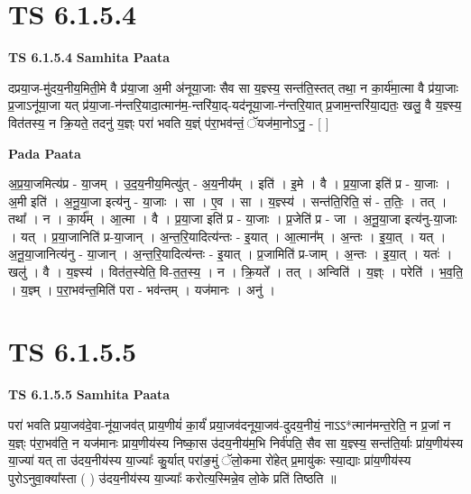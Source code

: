 \documentclass[17pt]{extarticle}
\begin{document}

\section{ TS 6.1.5.4 }

\textbf{TS 6.1.5.4 } \newline
\textbf{Samhita Paata} \newline

दप्रया॒ज-मु॑दय॒नीय॒मिती॒मे वै प्र॑या॒जा अ॒मी अ॑नूया॒जाः सैव सा य॒ज्ञ्स्य॒ सन्त॑ति॒स्तत् तथा॒ न का॒र्य॑मा॒त्मा वै प्र॑या॒जाः प्र॒जाऽनू॑या॒जा यत् प्र॑या॒जा-न॑न्तरि॒यादा॒त्मान॑म॒-न्तरि॑या॒द्-यद॑नूया॒जा-न॑न्तरि॒यात् प्र॒जाम॒न्तरि॑या॒द्यतः॒ खलु॒ वै य॒ज्ञ्स्य॒ वित॑तस्य॒ न क्रि॒यते॒ तदनु॑ य॒ज्ञ्ः परा॑ भवति य॒ज्ञ्ं प॑रा॒भव॑न्तं॒ ॅयज॑मा॒नोऽनु॒ - [  ] \newline

\textbf{Pada Paata} \newline

अ॒प्र॒या॒जमित्य॑प्र - या॒जम् । उ॒द॒य॒नीय॒मित्यु॑त् - अ॒य॒नीय᳚म् । इति॑ । इ॒मे । वै । प्र॒या॒जा इति॑ प्र - या॒जाः । अ॒मी इति॑ । अ॒नू॒या॒जा इत्य॑नु - या॒जाः । सा । ए॒व । सा । य॒ज्ञ्स्य॑ । सन्त॑ति॒रिति॒ सं - त॒तिः॒ । तत् । तथा᳚ । न । का॒र्य᳚म् । आ॒त्मा । वै । प्र॒या॒जा इति॑ प्र - या॒जाः । प्र॒जेति॑ प्र - जा । अ॒नू॒या॒जा इत्य॑नु-या॒जाः । यत् । प्र॒या॒जानिति॑ प्र-या॒जान् । अ॒न्त॒रि॒यादित्य॑न्तः - इ॒यात् । आ॒त्मान᳚म् । अ॒न्तः । इ॒या॒त् । यत् । अ॒नू॒या॒जानित्य॑नु - या॒जान् । अ॒न्त॒रि॒यादित्य॑न्तः - इ॒यात् । प्र॒जामिति॑ प्र-जाम् । अ॒न्तः । इ॒या॒त् । यतः॑ । खलु॑ । वै । य॒ज्ञ्स्य॑ । वित॑त॒स्येति॒ वि-त॒त॒स्य॒ । न । क्रि॒यते᳚ । तत् । अन्विति॑ । य॒ज्ञ्ः । परेति॑ । भ॒व॒ति॒ । य॒ज्ञ्म् । प॒रा॒भव॑न्त॒मिति॑ परा - भव॑न्तम् । यज॑मानः । अनु॑ ।  \newline





\section{ TS 6.1.5.5 }

\textbf{TS 6.1.5.5 } \newline
\textbf{Samhita Paata} \newline

परा॑ भवति प्रया॒जव॑दे॒वा-नू॑या॒जव॑त् प्राय॒णीयं॑ का॒र्यं॑ प्रया॒जव॑दनूया॒जव॑-दुदय॒नीयं॒ नाऽऽ*त्मान॑मन्त॒रेति॒ न प्र॒जां न य॒ज्ञ्ः प॑रा॒भव॑ति॒ न यज॑मानः प्राय॒णीय॑स्य निष्का॒स उ॑दय॒नीय॑म॒भि निर्व॑पति॒ सैव सा य॒ज्ञ्स्य॒ सन्त॑ति॒र्याः प्रा॑य॒णीय॑स्य या॒ज्या॑ यत् ता उ॑दय॒नीय॑स्य या॒ज्याः᳚ कु॒र्यात् परा॑ङ॒मुं ॅलो॒कमा रो॑हेत् प्र॒मायु॑कः स्या॒द्याः प्रा॑य॒णीय॑स्य पुरोऽनुवा॒क्या᳚स्ता ( ) उ॑दय॒नीय॑स्य या॒ज्याः᳚ करोत्य॒स्मिन्ने॒व लो॒के प्रति॑ तिष्ठति ॥ \newline
\end{document}
